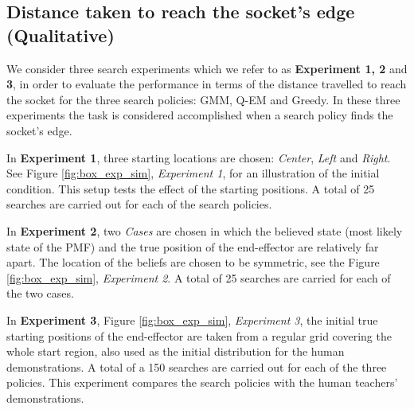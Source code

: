 
\subsection{Distance taken to reach the socket's edge (Qualitative)}

We consider three search experiments which we refer to as \textbf{Experiment 1, 2} and \textbf{3},
in order to evaluate the performance in terms of the distance travelled to reach the socket for the three search policies: GMM, Q-EM and Greedy.
In these three experiments the task is considered accomplished when a search policy finds the socket's edge. 

In \textbf{Experiment 1}, three starting locations are chosen: \textit{Center}, \textit{Left} and \textit{Right}. 
See Figure \ref{fig:box_exp_sim}, \textit{Experiment 1}, for an illustration of the initial condition. 
This setup tests the effect of the starting positions. A total of 25 searches are carried out for each of the search policies.

In \textbf{Experiment 2}, two \textit{Cases} are chosen in which the believed state (most likely state of the PMF) and the true position
of the end-effector are relatively far apart. The location of the beliefs are chosen to be symmetric, see the Figure \ref{fig:box_exp_sim}, 
\textit{Experiment 2}. A total of 25 searches are carried for each of the two cases.

In \textbf{Experiment 3}, Figure \ref{fig:box_exp_sim}, \textit{Experiment 3}, the initial true starting positions 
of the end-effector are taken from a regular grid covering the whole start region, also used as the initial distribution for 
the human demonstrations. A total of a 150 searches are carried out for each of the three policies. 
This experiment compares the search policies with the human teachers' demonstrations.

